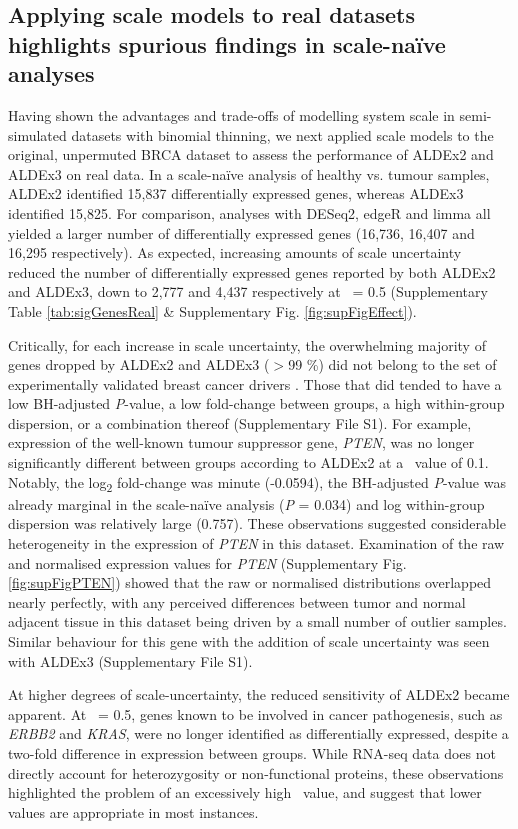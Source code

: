 \documentclass{article}
\begin{document}
\subsection{Applying scale models to real datasets highlights spurious findings in scale-na\"ive analyses}
Having shown the advantages and trade-offs of modelling system scale in semi-simulated datasets with binomial thinning, we next applied scale models to the original, unpermuted BRCA dataset to assess the performance of ALDEx2 and ALDEx3 on real data. In a scale-na\"ive analysis of healthy vs. tumour samples, ALDEx2 identified 15,837 differentially expressed genes, whereas ALDEx3 identified 15,825. For comparison, analyses with DESeq2, edgeR and limma all yielded a larger number of differentially expressed genes (16,736, 16,407 and 16,295 respectively). As expected, increasing amounts of scale uncertainty reduced the number of differentially expressed genes reported by both ALDEx2 and ALDEx3, down to 2,777 and 4,437 respectively at \textgamma~= 0.5 (Supplementary Table \ref{tab:sigGenesReal} \& Supplementary Fig. \ref{fig:supFigEffect}). 

Critically, for each increase in scale uncertainty, the overwhelming majority of genes dropped by ALDEx2 and ALDEx3 ($>$99 \%) did not belong to the set of experimentally validated breast cancer drivers \cite{repana_network_2019}. Those that did tended to have a low BH-adjusted \textit{P}-value, a low fold-change between groups, a high within-group dispersion, or a combination thereof (Supplementary File S1). For example, expression of the well-known tumour suppressor gene, \textit{PTEN}, was no longer significantly different between groups according to ALDEx2 at a \textgamma~value of 0.1. Notably, the log\textsubscript{2} fold-change was minute (-0.0594), the BH-adjusted \textit{P}-value was already marginal in the scale-na\"ive analysis (\textit{P} = 0.034) and log within-group dispersion was relatively large (0.757). These observations suggested considerable heterogeneity in the expression of \textit{PTEN} in this dataset. Examination of the raw and normalised expression values for \textit{PTEN} (Supplementary Fig. \ref{fig:supFigPTEN}) showed that the raw or normalised distributions overlapped nearly perfectly, with any perceived differences between tumor and normal adjacent tissue in this dataset being driven by a small number of outlier samples. Similar behaviour for this gene with the addition of scale uncertainty was seen with ALDEx3 (Supplementary File S1).

At higher degrees of scale-uncertainty, the reduced sensitivity of ALDEx2 became apparent. At \textgamma~= 0.5, genes known to be involved in cancer pathogenesis, such as \textit{ERBB2} and \textit{KRAS}, were no longer identified as differentially expressed, despite a two-fold difference in expression between groups. While RNA-seq data does not directly account for heterozygosity or non-functional proteins, these observations highlighted the problem of an excessively high \textgamma~value, and suggest that lower values are appropriate in most instances.
\end{document}
